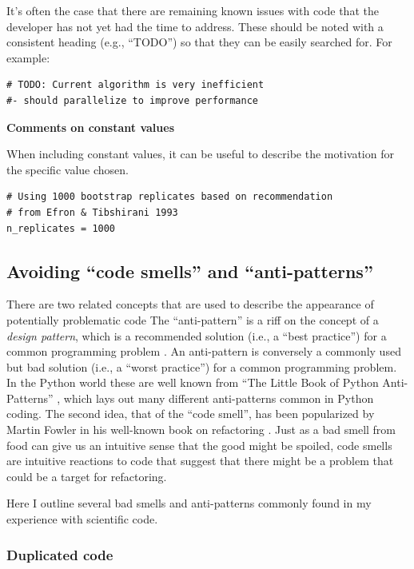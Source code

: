 It's often the case that there are remaining known issues with code that the developer has not yet had the time to address.
These should be noted with a consistent heading (e.g., ``TODO'') so that they can be easily searched for.
For example:

\begin{lstlisting}[style=Pythonshort]
# TODO: Current algorithm is very inefficient
#- should parallelize to improve performance
\end{lstlisting}

\textbf{Comments on constant values}

When including constant values, it can be useful to describe the motivation for the specific value chosen.

\begin{lstlisting}[style=Pythonshort]
# Using 1000 bootstrap replicates based on recommendation 
# from Efron & Tibshirani 1993
n_replicates = 1000
\end{lstlisting}

\subsection{Avoiding ``code smells'' and ``anti-patterns''}

There are two related concepts that are used to describe the appearance of potentially problematic code The ``anti-pattern'' is a riff on the concept of a \textit{design pattern}, which is a recommended solution (i.e., a ``best practice'') for a common programming problem \citep{Gamma:1995aa}.
An anti-pattern is conversely a commonly used but bad solution (i.e., a ``worst practice'') for a common programming problem.
In the Python world these are well known from ``The Little Book of Python Anti-Patterns'' \citep{quantifiedcode:2018}, which lays out many different anti-patterns common in Python coding.
The second idea, that of the ``code smell'', has been popularized by Martin Fowler in his well-known book on refactoring \citep{Fowler:1999aa}.
Just as a bad smell from food can give us an intuitive sense that the good might be spoiled, code smells are intuitive reactions to code that suggest that there might be a problem that could be a target for refactoring.

Here I outline several bad smells and anti-patterns commonly found in my experience with scientific code.

\subsubsection{Duplicated code}

